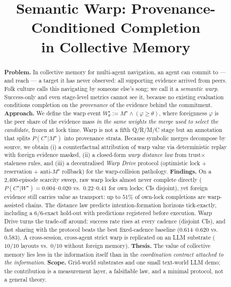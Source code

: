\documentclass{article}
\title{Semantic Warp: Provenance-Conditioned Completion\\in Collective Memory}
\newcommand{\wstar}{W^{\star}}
\newcommand{\mstar}{M^{\star}}
\newcommand{\cstar}{C^{\star}}
\begin{document}
\maketitle

\begin{abstract}
\textbf{Problem.} In collective memory for multi-agent navigation, an agent can commit to --- and reach --- a target it has never observed: all supporting evidence arrived from peers. Folk culture calls this navigating by someone else's song; we call it a \emph{semantic warp}. Success-only and even stage-level metrics cannot see it, because no existing evaluation conditions completion on the \emph{provenance} of the evidence behind the commitment.
\textbf{Approach.} We define the warp event $\wstar_\theta := \mstar \wedge (\varphi \ge \theta)$, where foreignness $\varphi$ is the peer share of the evidence mass \emph{in the same weights the merge used to select the candidate}, frozen at lock time. Warp is not a fifth Q/R/M/C stage but an annotation that splits $P(\cstar|\mstar)$ into provenance strata. Because symbolic merges decompose by source, we obtain (i) a counterfactual attribution of warp value via deterministic replay with foreign evidence masked, (ii) a closed-form \emph{warp distance law} from trust$\times$staleness rules, and (iii) a decentralised \emph{Warp Drive} protocol (optimistic lock + reservation + anti-$\mstar$ rollback) for the warp-collision pathology.
\textbf{Findings.} On a 2{,}400-episode scarcity sweep, raw warp locks almost never complete directly ($P(\cstar|\wstar)=0.004$--$0.020$ vs.\ $0.22$--$0.41$ for own locks; CIs disjoint), yet foreign evidence still carries value as transport: up to $51\%$ of own-lock completions are warp-assisted chains. The distance law predicts intention-formation horizons tick-exactly, including a $6/6$-exact hold-out with predictions registered before execution. Warp Drive turns the trade-off around: success rate rises at every cadence (disjoint CIs), and fast sharing with the protocol beats the best fixed-cadence baseline ($0.614$--$0.620$ vs.\ $0.583$). A cross-session, cross-agent strict warp is replicated on an LLM substrate ($10/10$ layouts vs.\ $0/10$ without foreign memory).
\textbf{Thesis.} The value of collective memory lies less in the information itself than in the \emph{coordination contract attached to the information}.
\textbf{Scope.} Grid-world substrates and one small text-world LLM demo; the contribution is a measurement layer, a falsifiable law, and a minimal protocol, not a general theory.
\end{abstract}
\end{document}
